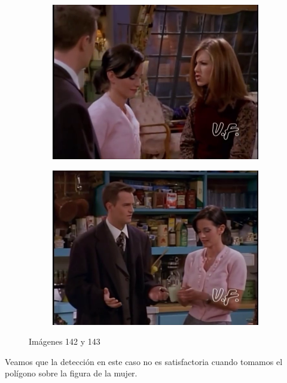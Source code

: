 \documentclass[12pt,a4paper]{article}
\begin{document}
\begin{figure}[H]
  \centering
    \begin{subfigure}{0.45\textwidth}
      \includegraphics[scale=0.33]{./Imagenes/142.png}
    \end{subfigure}
    \begin{subfigure}{0.45\textwidth}
      \includegraphics[scale=0.33]{./Imagenes/143.png}
    \end{subfigure}
    \caption{Imágenes 142 y 143}
\end{figure}

Veamos que la detección en este caso no es satisfactoria cuando tomamos el polígono sobre la figura de la mujer.
\end{document}
